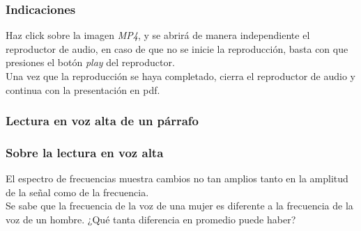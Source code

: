 \documentclass[12pt]{beamer}
\begin{document}
\begin{frame}
\frametitle{Indicaciones}
Haz click sobre la imagen \emph{MP4}, y se abrirá de manera independiente el reproductor de audio, en caso de que no se inicie la reproducción, basta con que presiones el botón \emph{play} del reproductor.
\\
\bigskip
\pause
Una vez que la reproducción se haya completado, cierra el reproductor de audio y continua con la presentación en pdf.
\end{frame}
\begin{frame}
\frametitle{Lectura en voz alta de un párrafo}
\begin{figure}
    \centering
\end{figure}
\end{frame}
\begin{frame}
\frametitle{Sobre la lectura en voz alta}
El espectro de frecuencias muestra cambios no tan amplios tanto en la amplitud de la señal como de la frecuencia.
\\
\bigskip
\pause
Se sabe que la frecuencia de la voz de una mujer es diferente a la frecuencia de la voz de un hombre. ¿Qué tanta diferencia en promedio puede haber?
\end{frame}
\end{document}
